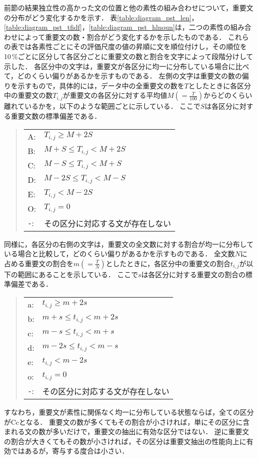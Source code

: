 前節の結果独立性の高かった文の位置と他の素性の組み合わせについて，重要文の分布がどう変化するかを示す．
表\ref{table:diagram_pst_len}，\ref{table:diagram_pst_tfidf}，\ref{table:diagram_pst_hlnoun}は，二つの素性の組み合わせによって重要文の数・割合がどう変化するかを示したものである．
これらの表では各素性ごとにその評価尺度の値の昇順に文を順位付けし，その順位を10\,\%ごとに区分して各区分ごとに重要文の数と割合を文字によって段階分けして示した．
各区分中の文字は，重要文が各区分に均一に分布している場合に比べて，どのくらい偏りがあるかを示すものである．
左側の文字は重要文の数の偏りを示すもので，具体的には，データ中の全重要文の数を\(T\)としたときに各区分中の重要文の数\(T_{i,j}\)が重要文の各区分に対する平均値\(M (= \frac{T}{100})\)からどのくらい離れているかを，以下のような範囲ごとに示している．
ここで\(S\)は各区分に対する重要文数の標準偏差である．
\begin{quote}
\begin{tabular}{ll}
A: & \(T_{i,j} \ge M + 2S\) \\
B: & \(M + S \le T_{i,j} < M + 2S \) \\
C: & \(M - S \le T_{i,j} < M + S \) \\
D: & \(M - 2S \le T_{i,j} < M - S \) \\
E: & \(T_{i,j} < M - 2S \) \\
O: & \(T_{i,j} = 0 \) \\
{\tt -}: & その区分に対応する文が存在しない
\end{tabular}
\end{quote}

同様に，各区分の右側の文字は，重要文の全文数に対する割合が均一に分布している場合と比較して，どのくらい偏りがあるかを示すものである．
全文数\(N\)に占める重要文の割合を\(m (= \frac{T}{N})\)としたときに，各区分中の重要文の割合\(t_{i,j}\)が以下の範囲にあることを示している．
ここで\(s\)は各区分に対する重要文の割合の標準偏差である．
\begin{quote}
\begin{tabular}{ll}
a: & \(t_{i,j} \ge m + 2s\) \\
b: & \(m + s \le t_{i,j} < m + 2s \) \\
c: & \(m - s \le t_{i,j} < m + s \) \\
d: & \(m - 2s \le t_{i,j} < m - s \) \\
e: & \(t_{i,j} < m - 2s \) \\
o: & \(t_{i,j} = 0 \) \\
{\tt -}: & その区分に対応する文が存在しない
\end{tabular}
\end{quote}
すなわち，重要文が素性に関係なく均一に分布している状態ならば，全ての区分がCcとなる．
重要文の数が多くてもその割合が小さければ，単にその区分に含まれる文の数が多いだけで，重要文の抽出に有効な区分ではない．
逆に重要文の割合が大きくてもその数が小さければ，その区分は重要文抽出の性能向上に有効ではあるが，寄与する度合は小さい．

